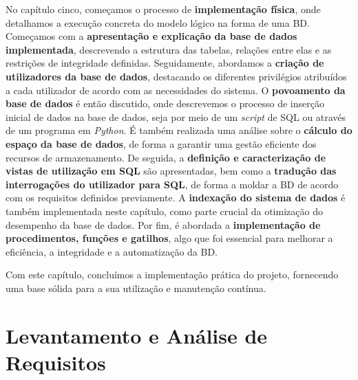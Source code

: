 \documentclass[a4paper,12pt]{scrreprt}
\begin{document}
    No capítulo cinco, começamos o processo de \textbf{implementação física}, onde detalhamos a execução concreta do modelo lógico na forma de uma BD. Começamos com a \textbf{apresentação e explicação da base de dados implementada}, descrevendo a estrutura das tabelas, relações entre elas e as restrições de integridade definidas. Seguidamente, abordamos a \textbf{criação de utilizadores da base de dados}, destacando os diferentes privilégios atribuídos a cada utilizador de acordo com as necessidades do sistema.
    O \textbf{povoamento da base de dados} é então discutido, onde descrevemos o processo de inserção inicial de dados na base de dados, seja por meio de um \textit{script} de SQL ou através de um programa em \textit{Python}.
    É também realizada uma análise sobre o \textbf{cálculo do espaço da base de dados}, de forma a garantir uma gestão eficiente dos recursos de armazenamento.
    De seguida, a \textbf{definição e caracterização de vistas de utilização em SQL} são apresentadas, bem como a  \textbf{tradução das interrogações do utilizador para SQL}, de forma a moldar a BD de acordo com os requisitos definidos previamente.
    A \textbf{indexação do sistema de dados} é também implementada neste capítulo, como parte crucial da otimização do desempenho da base de dados.
    Por fim, é abordada a \textbf{implementação de procedimentos, funções e gatilhos}, algo que foi essencial para melhorar a
    eficiência, a integridade e a automatização da BD.

Com este capítulo, concluímos a implementação prática do projeto, fornecendo uma base sólida para a sua utilização e manutenção contínua.



\chapter{Levantamento e Análise de Requisitos}
    \label{sec:requisitos}
\end{document}
